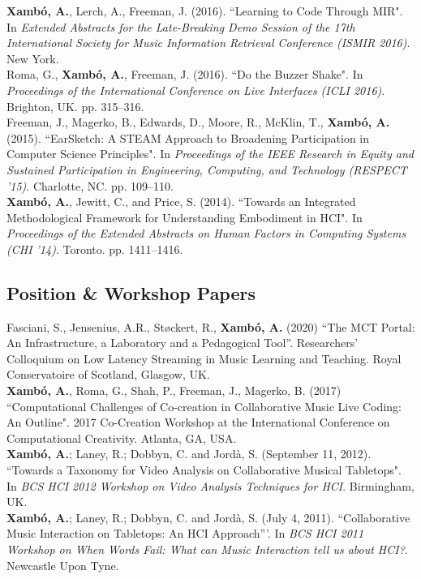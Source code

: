 \documentclass[10pt, a4paper]{article}
\newcommand{\years}[1]{\marginnote{\scriptsize #1}}
\begin{document}
{\years{2016b}\textbf{Xambó, A.}, Lerch, A., Freeman, J. (2016). “Learning to Code Through MIR". In \emph{Extended Abstracts for the Late-Breaking Demo Session of the 17th International Society for Music Information Retrieval Conference (ISMIR 2016)}. New York.\\
\years{2016a}Roma, G., \textbf{Xambó, A.}, Freeman, J. (2016). “Do the Buzzer Shake". In \emph{Proceedings of the International Conference on Live Interfaces (ICLI 2016)}. Brighton, UK. pp. 315--316.\\
\years{2015}Freeman, J., Magerko, B., Edwards, D., Moore, R., McKlin, T., \textbf{Xambó, A.} (2015). “EarSketch: A STEAM Approach to Broadening Participation in Computer Science Principles". In \emph{Proceedings of the IEEE Research in Equity and Sustained Participation in Engineering, Computing, and Technology (RESPECT '15)}. Charlotte, NC. pp. 109--110.\\
\years{2014}\textbf{Xambó, A.}, Jewitt, C., and Price, S. (2014). “Towards an Integrated Methodological Framework for Understanding Embodiment in HCI". In \emph{Proceedings of the Extended Abstracts on Human Factors in Computing Systems (CHI '14)}. Toronto. pp. 1411--1416.

\subsection*{Position \& Workshop Papers}
\noindent

\years{2020}Fasciani, S., Jensenius, A.R., Støckert, R., \textbf{Xambó, A.} (2020) ``The MCT Portal: An Infrastructure, a Laboratory and a Pedagogical Tool''. Researchers’ Colloquium on Low Latency Streaming in Music Learning and Teaching. Royal Conservatoire of Scotland, Glasgow, UK.\\
\years{2017}\textbf{Xambó, A.}, Roma, G., Shah, P., Freeman, J., Magerko, B. (2017) “Computational Challenges of Co-creation in Collaborative Music Live Coding: An Outline". 2017 Co-Creation Workshop at the International Conference on Computational Creativity. Atlanta, GA, USA.\\ 
\years{2012}\textbf{Xambó, A.}; Laney, R.; Dobbyn, C. and Jordà, S. (September 11, 2012). “Towards a Taxonomy for Video Analysis on Collaborative Musical Tabletops". In \emph{BCS HCI 2012 Workshop on Video Analysis Techniques for HCI}. Birmingham, UK.\\
\years{2011}\textbf{Xambó, A.}; Laney, R.; Dobbyn, C. and Jordà, S. (July 4, 2011). ``Collaborative Music Interaction on Tabletops: An HCI Approach'''. In \emph{BCS HCI 2011 Workshop on When Words Fail: What can Music Interaction tell us about HCI?}. Newcastle Upon Tyne.

}
\end{document}

